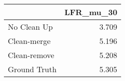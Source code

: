 \begin{tabular}{lr}
\toprule
{} & LFR_mu_30 \\
\midrule
No Clean Up  &     3.709 \\
Clean-merge  &     5.196 \\
Clean-remove &     5.208 \\
Ground Truth &     5.305 \\
\bottomrule
\end{tabular}
